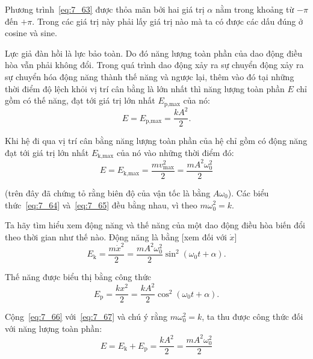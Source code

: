 \noindent
Phương trình~\eqref{eq:7_63} được thỏa mãn bởi hai giá trị $\alpha$ nằm trong khoảng từ $-\pi$ đến $+\pi$. Trong các giá trị này phải lấy giá trị nào mà ta có được các dấu đúng ở cosine và sine.

Lực giả đàn hồi là lực bảo toàn. Do đó năng lượng toàn phần của dao động điều hòa vẫn phải không đổi. Trong quá trình dao động xảy ra sự chuyển động xảy ra sự chuyển hóa động năng thành thế năng và ngược lại, thêm vào đó tại những thời điểm độ lệch khỏi vị trí cân bằng là lớn nhất thì năng lượng toàn phần $E$ chỉ gồm có thế năng, đạt tới giá trị lớn nhất $E_{\text{p,max}}$ của nó:
\begin{equation}\label{eq:7_64}
	E = E_{\text{p,max}} = \frac{kA^2}{2}.
\end{equation}

\noindent
Khi hệ đi qua vị trí cân bằng năng lượng toàn phần của hệ chỉ gồm có động năng đạt tới giá trị lớn nhất $E_{\text{k,max}}$ của nó vào những thời điểm đó:
\vspace{-12pt}
\begin{equation}\label{eq:7_65}
	E = E_{\text{k,max}} = \frac{mv_{\text{max}}^2}{2} = \frac{mA^2\omega_0^2}{2}
\end{equation}

\noindent
(trên đây đã chứng tỏ rằng biên độ của vận tốc là bằng $A\omega_0$). Các biểu thức~\eqref{eq:7_64} và~\eqref{eq:7_65} đều bằng nhau, vì theo  $m\omega_0^2=k$.

Ta hãy tìm hiểu xem động năng và thế năng của một dao động điều hòa biến đổi theo thời gian như thế nào. Động năng là bằng [xem  đối với $\dot{x}$]
\begin{equation}\label{eq:7_66}
	E_{\text{k}} = \frac{m\dot{x}^2}{2} = \frac{mA^2\omega_0^2}{2}\sin^2(\omega_0 t + \alpha).
\end{equation}

\noindent
Thế năng được biểu thị bằng công thức
\begin{equation}\label{eq:7_67}
	E_{\text{p}} = \frac{kx^2}{2} = \frac{kA^2}{2}\cos^2(\omega_0 t + \alpha).
\end{equation}

\noindent
Cộng~\eqref{eq:7_66} với~\eqref{eq:7_67} và chú ý rằng $m\omega_0^2=k$, ta thu được công thức đối với năng lượng toàn phần:
\begin{equation}\label{eq:7_68}
	E = E_{\text{k}} + E_{\text{p}}= \frac{kA^2}{2} = \frac{mA^2\omega_0^2}{2}
\end{equation}


